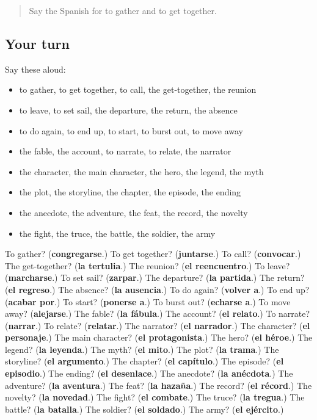 \begin{quote}
Say the Spanish for to gather and to get together.
\end{quote}

\subsection*{Your turn}
Say these aloud:

\begin{itemize}
\raggedright
  \item to gather, to get together, to call, the get-together, the reunion
  \item to leave, to set sail, the departure, the return, the absence
  \item to do again, to end up, to start, to burst out, to move away
  \item the fable, the account, to narrate, to relate, the narrator
  \item the character, the main character, the hero, the legend, the myth
  \item the plot, the storyline, the chapter, the episode, the ending
  \item the anecdote, the adventure, the feat, the record, the novelty
  \item the fight, the truce, the battle, the soldier, the army
\end{itemize}

\begin{tcolorbox}[breakable,colback=teal!4,colframe=teal!35!black,title={Before you move on}]
To gather? (\textbf{congregarse}.) To get together? (\textbf{juntarse}.) To call? (\textbf{convocar}.) The get-together? (\textbf{la tertulia}.) The reunion? (\textbf{el reencuentro}.) To leave? (\textbf{marcharse}.) To set sail? (\textbf{zarpar}.) The departure? (\textbf{la partida}.) The return? (\textbf{el regreso}.) The absence? (\textbf{la ausencia}.) To do again? (\textbf{volver a}.) To end up? (\textbf{acabar por}.) To start? (\textbf{ponerse a}.) To burst out? (\textbf{echarse a}.) To move away? (\textbf{alejarse}.) The fable? (\textbf{la fábula}.) The account? (\textbf{el relato}.) To narrate? (\textbf{narrar}.) To relate? (\textbf{relatar}.) The narrator? (\textbf{el narrador}.) The character? (\textbf{el personaje}.) The main character? (\textbf{el protagonista}.) The hero? (\textbf{el héroe}.) The legend? (\textbf{la leyenda}.) The myth? (\textbf{el mito}.) The plot? (\textbf{la trama}.) The storyline? (\textbf{el argumento}.) The chapter? (\textbf{el capítulo}.) The episode? (\textbf{el episodio}.) The ending? (\textbf{el desenlace}.) The anecdote? (\textbf{la anécdota}.) The adventure? (\textbf{la aventura}.) The feat? (\textbf{la hazaña}.) The record? (\textbf{el récord}.) The novelty? (\textbf{la novedad}.) The fight? (\textbf{el combate}.) The truce? (\textbf{la tregua}.) The battle? (\textbf{la batalla}.) The soldier? (\textbf{el soldado}.) The army? (\textbf{el ejército}.)
\end{tcolorbox}
